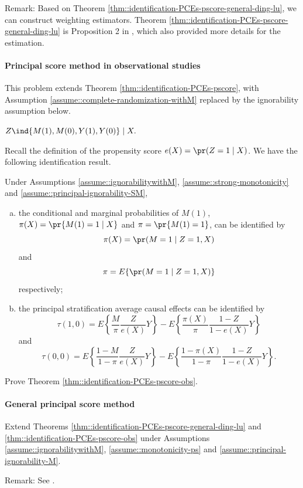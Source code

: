 Remark:
Based on Theorem \ref{thm::identification-PCEs-pscore-general-ding-lu}, we can construct weighting estimators. Theorem \ref{thm::identification-PCEs-pscore-general-ding-lu} is Proposition 2 in \citet{ding2017principal}, which also provided more details for the estimation. 



\paragraph{Principal score method in observational studies}
\label{hw::principalscore-observational}

This problem extends Theorem \ref{thm::identification-PCEs-pscore}, with Assumption \ref{assume::complete-randomization-withM} replaced by the ignorability assumption below.


\begin{assumption}
\label{assume::ignorabilitywithM}
$
Z\ind \{ M(1), M(0), Y(1) , Y(0) \} \mid X.
$
\end{assumption}

Recall the definition of the propensity score $e(X) = \pr(Z=1\mid X)$. 
We have the following identification result. 


\begin{theorem}
\label{thm::identification-PCEs-pscore-obs}
Under Assumptions \ref{assume::ignorabilitywithM}, \ref{assume::strong-monotonicity} and \ref{assume::principal-ignorability-SM}, 
\begin{enumerate}
[(a)]
\item 
the conditional and marginal probabilities of $M(1)$, 
$\pi(X) =  \pr\{ M(1)=1\mid X \}  $ and $\pi =  \pr\{ M(1)=1\} $, can be identified by
$$
\pi(X)   =  \pr(M=1\mid Z=1, X ) 
$$ 
and 
$$
\pi  =  E\{\pr(M=1\mid Z=1, X ) \}
$$ 
respectively; 
\item
the principal  stratification average causal effects can be identified by 
$$
\tau(1,0) = E\left\{   \frac{M}{\pi}   \frac{Z}{e(X)} Y \right\}
- E\left\{   \frac{ \pi(X)  }{\pi}   \frac{1-Z}{1-e(X)} Y    \right\} 
$$
and
$$
\tau(0,0) = E\left\{   \frac{1-M}{1-\pi}   \frac{Z}{e(X)} Y \right\}
- E\left\{   \frac{ 1- \pi(X)  }{1 - \pi}   \frac{1-Z}{1-e(X)} Y    \right\} .
$$
\end{enumerate}
\end{theorem}


Prove Theorem \ref{thm::identification-PCEs-pscore-obs}. 


 


\paragraph{General principal score method}
\label{hw::general-principal-score-jiangetal}

Extend Theorems \ref{thm::identification-PCEs-pscore-general-ding-lu} and \ref{thm::identification-PCEs-pscore-obs} under Assumptions  \ref{assume::ignorabilitywithM}, \ref{assume::monotonicity-ps} and \ref{assume::principal-ignorability-M}. 


Remark: See \citet{jiang2020multiply}. 


  
 
